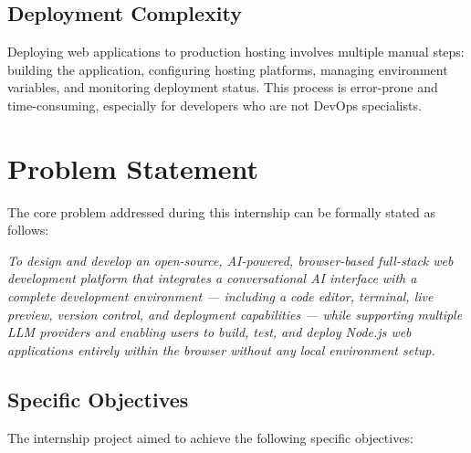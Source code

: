 \documentclass[12pt,a4paper,openany]{report}
\begin{document}
\subsection{Deployment Complexity}
Deploying web applications to production hosting involves multiple manual steps: building the application, configuring hosting platforms, managing environment variables, and monitoring deployment status. This process is error-prone and time-consuming, especially for developers who are not DevOps specialists.

\section{Problem Statement}

The core problem addressed during this internship can be formally stated as follows:

\textit{To design and develop an open-source, AI-powered, browser-based full-stack web development platform that integrates a conversational AI interface with a complete development environment --- including a code editor, terminal, live preview, version control, and deployment capabilities --- while supporting multiple LLM providers and enabling users to build, test, and deploy Node.js web applications entirely within the browser without any local environment setup.}

\subsection{Specific Objectives}
The internship project aimed to achieve the following specific objectives:
\end{document}
